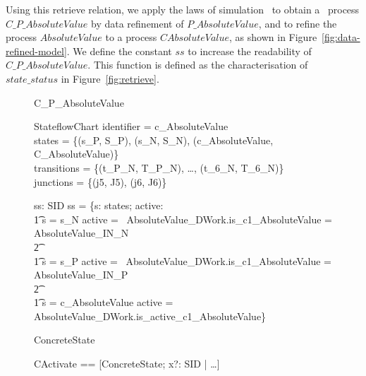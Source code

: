 \documentclass[submission]{eptcs}
\begin{document}
Using this retrieve relation, we apply the laws of simulation~\cite{Cavalcanti2003a,Oliveira2006a} to obtain a \Circus\ process $C\_P\_AbsoluteValue$ by data refinement of $P\_AbsoluteValue$, and to refine the process $AbsoluteValue$ to a process $CAbsoluteValue$, as shown in Figure~\ref{fig:data-refined-model}. We  define the constant $ss$ to increase the readability of $C\_P\_AbsoluteValue$. This function is defined as the characterisation of $state\_status$ in Figure~\ref{fig:retrieve}.

\begin{figure}
\centering
\hspace{-.8cm}
\begin{minipage}{\textwidth}
\begin{circus}
\circprocess C\_P\_AbsoluteValue \circdef \circbegin\\
\end{circus}
\vspace{-1.4cm}
\begin{axdef}
StateflowChart
\where
identifier = c\_AbsoluteValue\\
states = \{(s\_P, S\_P), (s\_N, S\_N), (c\_AbsoluteValue, C\_AbsoluteValue)\}\\
transitions = \{(t\_P\_N, T\_P\_N),  \ldots, (t\_6\_N, T\_6\_N)\}\\
junctions = \{(j5, J5), (j6, J6)\}
\end{axdef}
\vspace{-1cm}
\begin{axdef}
ss: SID \pfun \boolean
\where
ss = \{s: \dom states; active: \boolean \circspot\\\t1
s = s\_N \land active = \IF~AbsoluteValue\_DWork.is\_c1\_AbsoluteValue = AbsoluteValue\_IN\_N\\
\t2 \THEN~\true \ELSE~\false \lor\\\t1
s = s\_P \land active = \IF~AbsoluteValue\_DWork.is\_c1\_AbsoluteValue = AbsoluteValue\_IN\_P\\
\t2 \THEN~\true \ELSE~\false\lor\\\t1
s = c\_AbsoluteValue \land active = AbsoluteValue\_DWork.is\_active\_c1\_AbsoluteValue\}
\end{axdef}
\vspace{-1cm}
\begin{circusaction}
\circstate ConcreteState
\end{circusaction}
\vspace{-1.1cm}
\begin{zed}
CActivate == [\Delta ConcreteState; x?: SID | \ldots]\\

\end{zed}
\end{minipage}
\end{figure}
\end{document}
